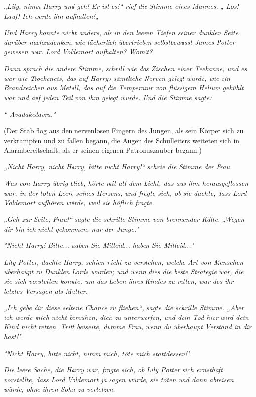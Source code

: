 {„\emph{Lily, nimm Harry und geh! Er ist es!“ rief die Stimme eines Mannes. „ Los! Lauf! Ich werde} \emph{ihn aufhalten!}„

\emph{\emph{Und Harry konnte nicht anders, als in den leeren Tiefen seiner dunklen Seite darüber nachzudenken, wie lächerlich übertrieben selbstbewusst James Potter gewesen war. Lord Voldemort aufhalten? Womit?}}

\emph{\emph{Dann sprach die andere Stimme, schrill wie das Zischen einer Teekanne, und es war wie Trockeneis, das auf Harrys sämtliche Nerven gelegt wurde, wie ein} \emph{Brandzeichen} \emph{aus Metall, das auf} \emph{die Temperatur von} \emph{flüssigem} \emph{Helium gekühlt} \emph{war} \emph{und auf jeden Teil von ihm gelegt wurde. Und die Stimme sagte:}}

\emph{\emph{“ Avadakedavra."}}

(Der Stab flog aus den nervenlosen Fingern des Jungen, als sein Körper sich zu verkrampfen und zu fallen begann, die Augen des Schulleiters weiteten sich in Alarmbereitschaft, als er seinen eigenen Patronuszauber begann.)

\emph{\emph{„Nicht Harry, nicht Harry, bitte nicht Harry!“ schrie die Stimme der Frau.}}

\emph{\emph{Was von Harry übrig blieb, hörte mit all dem Licht, das aus ihm herausgeflossen war, in der toten Leere seines Herzens, und fragte sich, ob sie dachte, dass Lord Voldemort aufhören würde, weil sie höflich fragte.}}

\emph{\emph{„Geh zur Seite, Frau!“ sagte die schrille Stimme von brennender Kälte. „Wegen dir bin ich nicht gekommen, nur der Junge."}}

\emph{\emph{"Nicht Harry! Bitte... haben Sie Mitleid... haben Sie Mitleid..."}}

\emph{\emph{Lily Potter, dachte Harry, schien nicht zu verstehen, welche Art von Menschen überhaupt zu Dunklen Lords wurden; und wenn dies die beste Strategie war, die sie sich vorstellen konnte, um das Leben ihres Kindes zu retten, war das ihr letztes Versagen als Mutter.}}

\emph{\emph{„Ich gebe dir diese seltene Chance zu fliehen“, sagte die schrille Stimme. „Aber ich werde mich nicht bemühen, dich zu unterwerfen, und dein Tod hier wird dein Kind nicht retten. Tritt beiseite, dumme Frau, wenn du überhaupt Verstand in dir hast!"}}

\emph{\emph{"Nicht Harry, bitte nicht, nimm mich, töte mich stattdessen!"}}

\emph{\emph{Die leere Sache, die Harry war, fragte sich, ob Lily Potter sich ernsthaft vorstellte, dass Lord Voldemort ja sagen würde, sie töten und dann abreisen würde, ohne ihren Sohn zu verletzen.}}

}
